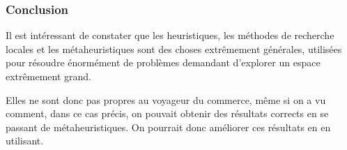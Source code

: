   \subsubsection{Conclusion}
    Il est intéressant de constater que les heuristiques, les méthodes de
    recherche locales et les métaheuristiques sont des choses extrêmement
    générales, utilisées pour résoudre énormément de problèmes demandant
    d'explorer un espace extrêmement grand.

    Elles ne sont donc pas propres au voyageur du commerce, même si on a vu
    comment, dans ce cas précis, on pouvait obtenir des résultats corrects en
    se passant de métaheuristiques. On pourrait donc améliorer ces résultats en
    en utilisant.
